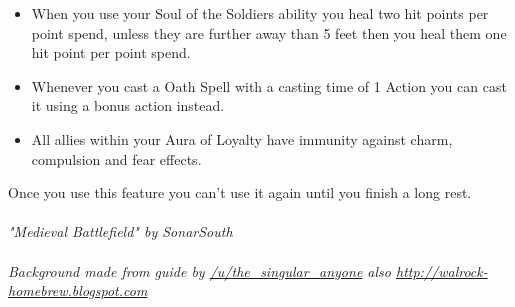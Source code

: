 \documentclass[22pt,a4paper,twocolumn]{article}
\begin{document}
\begin{itemize}
\item When you use your Soul of the Soldiers ability you heal two hit points per point spend, unless they are further away than 5 feet then you heal them one hit point per point spend.
\item Whenever you cast a Oath Spell with a casting time of 1 Action you can cast it using a bonus action instead.
\item All allies within your Aura of Loyalty have immunity against charm, compulsion and fear effects.
\end{itemize}
Once you use this feature you can't use it again until you finish a long rest.\\
\\
\textit{"Medieval Battlefield" by SonarSouth}
\\
\\
\textit{Background made from guide by \href{https://www.reddit.com/r/UnearthedArcana/comments/3qb7tp/paladin_oath_of_battle_critique_very_welcome/cwdprpo}{/u/the\_singular\_anyone} also \href{http://walrock-homebrew.blogspot.com}{http://walrock-homebrew.blogspot.com}}	
\end{document}
